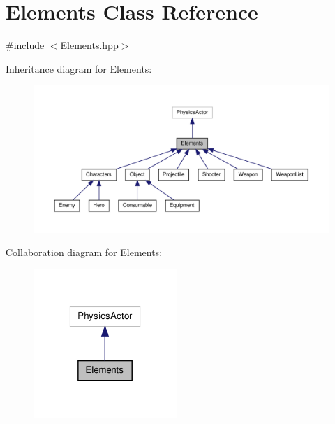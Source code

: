 \hypertarget{class_elements}{\section{Elements Class Reference}
\label{class_elements}
}


{\ttfamily \#include $<$Elements.\-hpp$>$}



Inheritance diagram for Elements\-:
\nopagebreak
\begin{figure}[H]
\begin{center}
\leavevmode
\includegraphics[width=350pt]{class_elements__inherit__graph}
\end{center}
\end{figure}


Collaboration diagram for Elements\-:
\nopagebreak
\begin{figure}[H]
\begin{center}
\leavevmode
\includegraphics[width=154pt]{class_elements__coll__graph}
\end{center}
\end{figure}
